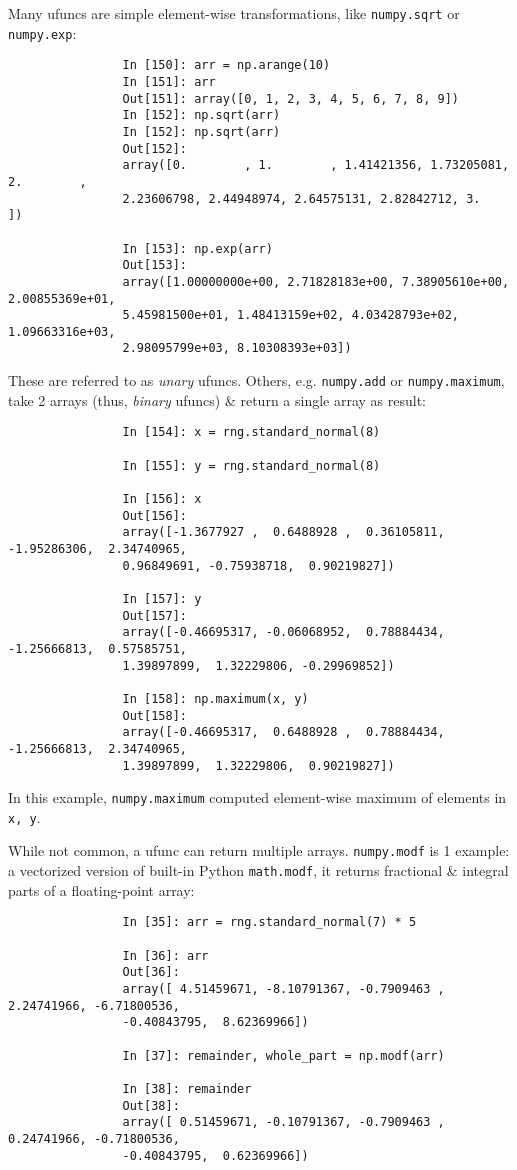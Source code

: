 \documentclass{article}
\begin{document}
\begin{enumerate}
\begin{itemize}
\begin{itemize}
			Many ufuncs are simple element-wise transformations, like {\tt numpy.sqrt} or {\tt numpy.exp}:
			\begin{verbatim}
				In [150]: arr = np.arange(10)
				In [151]: arr
				Out[151]: array([0, 1, 2, 3, 4, 5, 6, 7, 8, 9])
				In [152]: np.sqrt(arr)
				In [152]: np.sqrt(arr)
				Out[152]: 
				array([0.        , 1.        , 1.41421356, 1.73205081, 2.        ,
				2.23606798, 2.44948974, 2.64575131, 2.82842712, 3.        ])
				
				In [153]: np.exp(arr)
				Out[153]: 
				array([1.00000000e+00, 2.71828183e+00, 7.38905610e+00, 2.00855369e+01,
				5.45981500e+01, 1.48413159e+02, 4.03428793e+02, 1.09663316e+03,
				2.98095799e+03, 8.10308393e+03])
			\end{verbatim}
			These are referred to as {\it unary} ufuncs. Others, e.g. {\tt numpy.add} or {\tt numpy.maximum}, take 2 arrays (thus, {\it binary} ufuncs) \& return a single array as result:
			\begin{verbatim}
				In [154]: x = rng.standard_normal(8)
				
				In [155]: y = rng.standard_normal(8)
				
				In [156]: x
				Out[156]: 
				array([-1.3677927 ,  0.6488928 ,  0.36105811, -1.95286306,  2.34740965,
				0.96849691, -0.75938718,  0.90219827])
				
				In [157]: y
				Out[157]: 
				array([-0.46695317, -0.06068952,  0.78884434, -1.25666813,  0.57585751,
				1.39897899,  1.32229806, -0.29969852])
				
				In [158]: np.maximum(x, y)
				Out[158]: 
				array([-0.46695317,  0.6488928 ,  0.78884434, -1.25666813,  2.34740965,
				1.39897899,  1.32229806,  0.90219827])
			\end{verbatim}
			In this example, {\tt numpy.maximum} computed element-wise maximum of elements in {\tt x, y}.
			
			While not common, a ufunc can return multiple arrays. {\tt numpy.modf} is 1 example: a vectorized version of built-in Python {\tt math.modf}, it returns fractional \& integral parts of a floating-point array:
			\begin{verbatim}
				In [35]: arr = rng.standard_normal(7) * 5
				
				In [36]: arr
				Out[36]: 
				array([ 4.51459671, -8.10791367, -0.7909463 ,  2.24741966, -6.71800536,
				-0.40843795,  8.62369966])
				
				In [37]: remainder, whole_part = np.modf(arr)
				
				In [38]: remainder
				Out[38]: 
				array([ 0.51459671, -0.10791367, -0.7909463 ,  0.24741966, -0.71800536,
				-0.40843795,  0.62369966])
				

\end{verbatim}
\end{itemize}
\end{itemize}
\end{enumerate}
\end{document}
